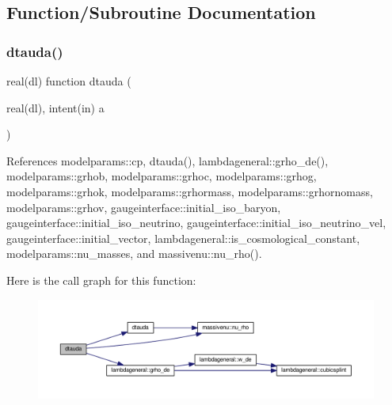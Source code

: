 \subsection{Function/\+Subroutine Documentation}
\mbox{\label{equations__ppf_8f90_a1c228811398a4401bb57d778911a13df}} 
\subsubsection{\texorpdfstring{dtauda()}{dtauda()}}
{\footnotesize\ttfamily real(dl) function dtauda (\begin{DoxyParamCaption}\item[{real(dl), intent(in)}]{a }\end{DoxyParamCaption})}



References modelparams\+::cp, dtauda(), lambdageneral\+::grho\+\_\+de(), modelparams\+::grhob, modelparams\+::grhoc, modelparams\+::grhog, modelparams\+::grhok, modelparams\+::grhormass, modelparams\+::grhornomass, modelparams\+::grhov, gaugeinterface\+::initial\+\_\+iso\+\_\+baryon, gaugeinterface\+::initial\+\_\+iso\+\_\+neutrino, gaugeinterface\+::initial\+\_\+iso\+\_\+neutrino\+\_\+vel, gaugeinterface\+::initial\+\_\+vector, lambdageneral\+::is\+\_\+cosmological\+\_\+constant, modelparams\+::nu\+\_\+masses, and massivenu\+::nu\+\_\+rho().

Here is the call graph for this function\+:
\nopagebreak
\begin{figure}[H]
\begin{center}
\leavevmode
\includegraphics[width=350pt]{equations__ppf_8f90_a1c228811398a4401bb57d778911a13df_cgraph}
\end{center}
\end{figure}
\mbox{\label{equations__ppf_8f90_a2c95a3b42a68aa87a21097ce3ff8bbe6}} 
